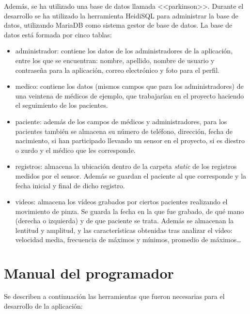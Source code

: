 Además, se ha utilizado una base de datos llamada <<parkinson>>. Durante el desarrollo se ha utilizado la herramienta HeidiSQL para administrar la base de datos, utilizando MariaDB como sistema gestor de base de datos. La base de datos está formada por cinco tablas:
\begin{itemize}
    \item administrador: contiene los datos de los administradores de la aplicación, entre los que se encuentran: nombre, apellido, nombre de usuario y contraseña para la aplicación, correo electrónico y foto para el perfil.
    \item medico: contiene los datos (mismos campos que para los administradores) de una veintena de médicos de ejemplo, que trabajarían en el proyecto haciendo el seguimiento de los pacientes.
    \item paciente: además de los campos de médicos y administradores, para los pacientes también se almacena su número de teléfono, dirección, fecha de nacimiento, si han participado llevando un sensor en el proyecto, si es diestro o zurdo y el médico que les corresponde.
    \item registros: almacena la ubicación dentro de la carpeta \textit{static} de los registros medidos por el sensor. Además se guardan el paciente al que corresponde y la fecha inicial y final de dicho registro.
    \item videos: almacena los vídeos grabados por ciertos pacientes realizando el movimiento de pinza. Se guarda la fecha en la que fue grabado, de qué mano (derecha o izquierda) y de que paciente se trata. Además se almacenan la lentitud y amplitud, y las características obtenidas tras analizar el vídeo: velocidad media, frecuencia de máximos y mínimos, promedio de máximos\ldots
\end{itemize}




\section{Manual del programador}
Se describen a continuación las herramientas que fueron necesarias para el desarrollo de la aplicación:

